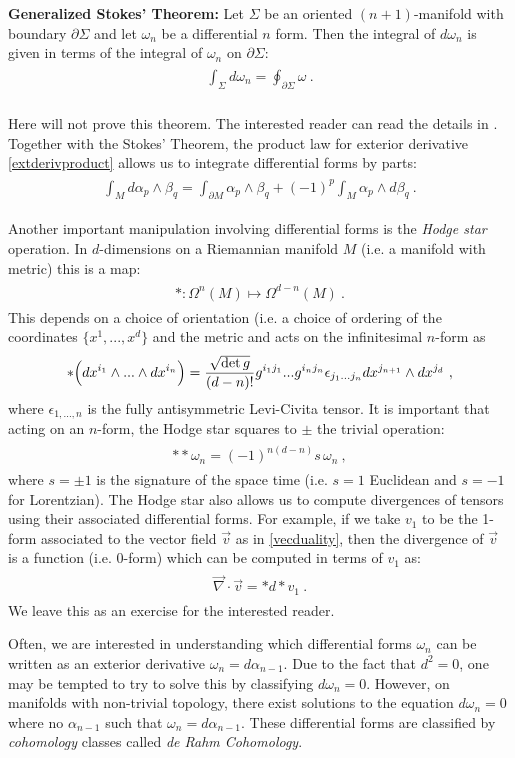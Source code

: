 \documentclass[11pt]{article}
\newcommand{\eq}[1]{\begin{align}\begin{split}#1\end{split}\end{align}}
\begin{document}
\noindent \textbf{Generalized Stokes' Theorem:} Let $\Sigma$ be an oriented $(n+1)$-manifold with boundary $\partial \Sigma$ and let $\omega_n$ be a differential $n$ form. Then the integral of $d\omega_n$ is given in terms of the integral of $\omega_n$ on $\partial \Sigma$:
\eq{
\int_\Sigma d\omega_n=\oint_{\partial \Sigma}\omega~. 
}
~\\



\noindent Here will not prove this theorem. The interested reader can read the details in \cite{Nakahara:2003nw}.\\

Together with the Stokes' Theorem, the product law for exterior derivative \eqref{extderivproduct} allows us to integrate differential forms by parts:
\eq{
\int_M d\alpha_p\wedge \beta_q=\int_{\partial M}\alpha_p\wedge \beta_q+(-1)^p\int_M\alpha_p\wedge d\beta_q~. 
}



\bigskip 

Another important manipulation involving differential forms is the \emph{Hodge star} operation. In $d$-dimensions on a Riemannian manifold $M$ (i.e. a manifold with metric) this is a map: 
\eq{
\ast : \Omega^n(M)\longmapsto \Omega^{d-n}(M)~. 
}
This depends on a choice of orientation (i.e. a choice of ordering of the coordinates $\{x^1,...,x^d\}$ and the metric and acts on the infinitesimal $n$-form  as 
\eq{
\ast\Big(dx^{i_1}\wedge... \wedge dx^{i_n}\Big)=\frac{\sqrt{{\rm det}\,g}}{(d-n)!}g^{i_1j_1}...g^{i_nj_n}\epsilon_{j_1...j_n} dx^{j_{n+1}}\wedge dx^{j_d}~,
}
where $\epsilon_{1,...,n}$ is the fully antisymmetric Levi-Civita tensor. 
It is important that acting on an $n$-form, the Hodge star squares to $\pm$ the trivial operation:
\eq{
\ast \ast \omega_n=(-1)^{n(d-n)}s\,\omega_n~,
}
where $s=\pm 1$ is the signature of the space time (i.e. $s=1$ Euclidean and $s=-1$ for Lorentzian). The Hodge star also allows us to compute divergences of tensors using their associated differential forms. For example, if we take $v_1$ to be the 1-form associated to the vector field $\vec{v}$ as in \eqref{vecduality}, then the divergence of $\vec{v}$ is a function (i.e. 0-form) which can be computed in terms of $v_1$ as:
\eq{
\vec\nabla\cdot \vec{v}=\ast d\ast v_1~. 
}
We leave this as an exercise for the interested reader.

\bigskip

Often, we are interested in understanding which differential forms $\omega_n$ can be written as an exterior derivative $\omega_n=d\alpha_{n-1}$. Due to the fact that $d^2=0$, one may be tempted to try to solve this by classifying $d\omega_n=0$. However, on manifolds with non-trivial topology, there exist solutions to the equation $d\omega_n=0$ where no $\alpha_{n-1}$ such that $\omega_n=d\alpha_{n-1}$. These differential forms are classified by \emph{cohomology} classes called \emph{de Rahm Cohomology}. 
\end{document}
